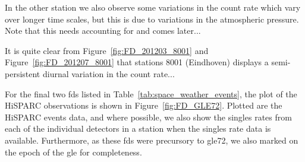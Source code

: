 In the other station we also observe some variations in the count rate which vary over longer time scales, but this is due to variations in the atmospheric pressure. Note that this needs accounting for and comes later...

It is quite clear from Figure~\ref{fig:FD_201203_8001} and Figure~\ref{fig:FD_201207_8001} that stations 8001 (Eindhoven) displays a semi-persistent diurnal variation in the count rate...

For the final two \glspl{fd} listed in Table~\ref{tab:space_weather_events}, the plot of the HiSPARC observations is shown in Figure~\ref{fig:FD_GLE72}. Plotted are the HiSPARC events data, and where possible, we also show the singles rates from each of the individual detectors in a station when the singles rate data is available. Furthermore, as these \glspl{fd} were precursory to \gls{gle}72, we also marked on the epoch of the \gls{gle} for completeness.

